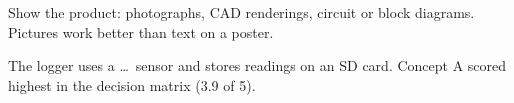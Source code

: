 \begin{guidance}
Show the product: photographs, CAD renderings, circuit or block diagrams.
Pictures work better than text on a poster.
\end{guidance}


The logger uses a \ldots\ sensor and stores readings on an SD card. Concept A
scored highest in the decision matrix (3.9 of 5).
